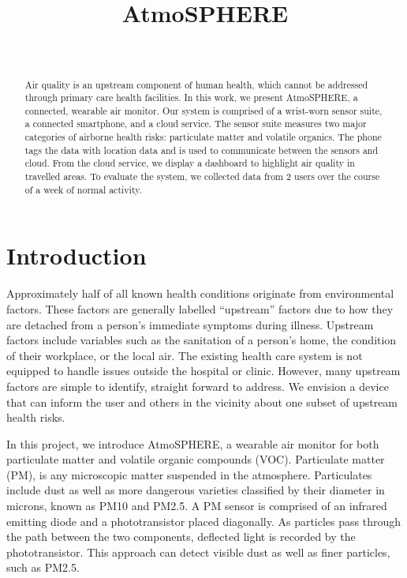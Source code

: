 \documentclass{sigchi}
\begin{document}
\title{AtmoSPHERE}

\author{%
     \\
}

\maketitle

\begin{abstract}
    Air quality is an upstream component of human health, which cannot be addressed through primary care health facilities.
    In this work, we present AtmoSPHERE, a connected, wearable air monitor.
    Our system is comprised of a wrist-worn sensor suite, a connected smartphone, and a cloud service.
    The sensor suite measures two major categories of airborne health risks: particulate matter and volatile organics.
    The phone tags the data with location data and is used to communicate between the sensors and cloud.
    From the cloud service, we display a dashboard to highlight air quality in travelled areas.
    To evaluate the system, we collected data from 2 users over the course of a week of normal activity.
\end{abstract}



\section{Introduction}
Approximately half of all known health conditions originate from environmental factors\cite{Manchanda:TEDTalk}.
These factors are generally labelled ``upstream'' factors due to how they are detached from a person's immediate symptoms during illness.
Upstream factors include variables such as the sanitation of a person's home, the condition of their workplace, or the local air.
The existing health care system is not equipped to handle issues outside the hospital or clinic.
However, many upstream factors are simple to identify, straight forward to address.
We envision a device that can inform the user and others in the vicinity about one subset of upstream health risks.

In this project, we introduce AtmoSPHERE, a wearable air monitor for both particulate matter and volatile organic compounds (VOC).
Particulate matter (PM), is any microscopic matter suspended in the atmosphere.
Particulates include dust as well as more dangerous varieties classified by their diameter in microns, known as PM10 and PM2.5.
A PM sensor is comprised of an infrared emitting diode and a phototransistor placed diagonally\cite{PMSensor:Datasheet}.
As particles pass through the path between the two components, deflected light is recorded by the phototransistor.
This approach can detect visible dust as well as finer particles, such as PM2.5.
\end{document}
